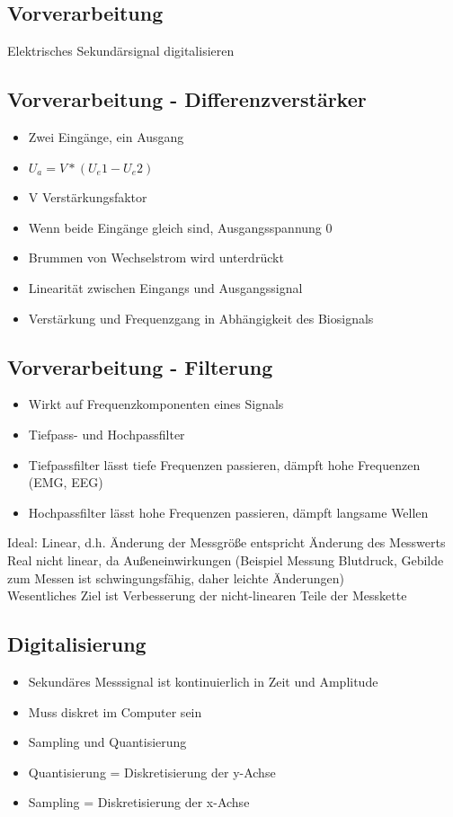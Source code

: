 \documentclass[a4paper,10pt,oneside]{article}
\begin{document}
\subsection{Vorverarbeitung}
Elektrisches Sekundärsignal digitalisieren \\

\subsection{Vorverarbeitung - Differenzverstärker}
\begin{itemize}
	\item Zwei Eingänge, ein Ausgang
	\item $U_a = V*(U_e1-U_e2)$
	\item V Verstärkungsfaktor
	\item Wenn beide Eingänge gleich sind, Ausgangsspannung 0
	\item Brummen von Wechselstrom wird unterdrückt
	\item Linearität zwischen Eingangs und Ausgangssignal
	\item Verstärkung und Frequenzgang in Abhängigkeit des Biosignals
\end{itemize}

\subsection{Vorverarbeitung - Filterung}
\begin{itemize}
	\item Wirkt auf Frequenzkomponenten eines Signals
	\item Tiefpass- und Hochpassfilter
	\item Tiefpassfilter lässt tiefe Frequenzen passieren, dämpft hohe Frequenzen (EMG, EEG)
	\item Hochpassfilter lässt hohe Frequenzen passieren, dämpft langsame Wellen
\end{itemize}

Ideal: Linear, d.h. Änderung der Messgröße entspricht Änderung des Messwerts\\
Real nicht linear, da Außeneinwirkungen (Beispiel Messung Blutdruck, Gebilde zum Messen ist schwingungsfähig, daher leichte Änderungen)\\
Wesentliches Ziel ist Verbesserung der nicht-linearen Teile der Messkette

\subsection{Digitalisierung}
\begin{itemize}
	\item Sekundäres Messsignal ist kontinuierlich in Zeit und Amplitude
	\item Muss diskret im Computer sein
	\item Sampling und Quantisierung
	\item Quantisierung = Diskretisierung der y-Achse
	\item Sampling = Diskretisierung der x-Achse
\end{itemize}
\end{document}
